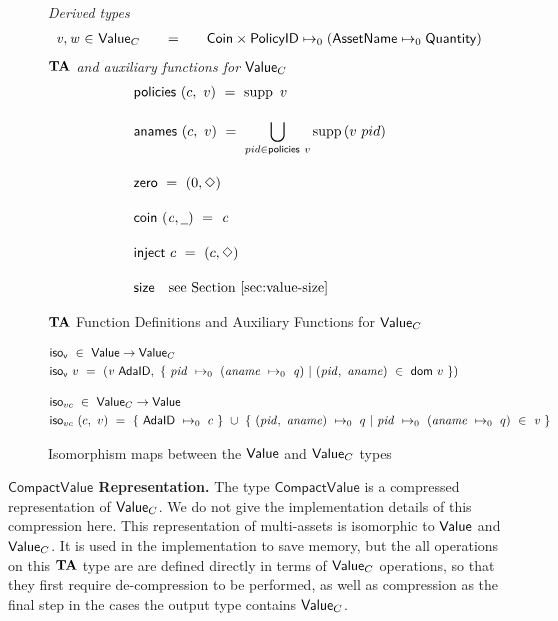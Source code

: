 \begin{figure*}[t!]
  \emph{Derived types}
  \begin{equation*}
    \begin{array}{r@{~\in~}l@{\qquad=\qquad}lr}
      \var{v}, \var{w} & \Value_C
      & \Coin \times \PolicyID \mapsto_0 ( \AssetName \mapsto_0 \Quantity )
    \end{array}
  \end{equation*}
  \emph{$\mathbf{TA}$ and auxiliary functions for $\mathsf{Value}_C$}
  \begin{align*}
    & \fun{policies}~(c,~v) ~=~ \supp{~v}
    \nextdef
    & \fun{anames}~(c, ~v) ~=~ \bigcup_{pid \in\fun{policies}{~v}} \supp{(v~pid)}
    \nextdef
    & \fun{zero} ~=~ (0, \Nothing)
    \nextdef
    & \fun{coin}~(\var{c}, \wcard) ~=~ \var{c}
    \nextdef
    & \fun{inject}~c  ~=~ (c, \Nothing)
    \nextdef
    & \fun{size} ~~~ \text{see Section \ref{sec:value-size}}
  \end{align*}
  \caption{$\mathbf{TA}$ Function Definitions and Auxiliary Functions for $\mathsf{Value}_C$}
  \label{fig:special-ada}
\end{figure*}

\begin{figure*}[t!]
  \begin{align*}
    & \fun{iso_v} ~\in~ \Value \to \Value_C \\
    & \fun{iso_v}~v ~=~(\var{v}~\mathsf{AdaID},~\{~\var{pid}~\mapsto_0~(\var{aname}~\mapsto_0~\var{q})~
    \vert~(\var{pid},~\var{aname})~\in~\fun{dom}~{v}~\})
    \nextdef
    & \fun{iso}_{vc} ~\in~ \Value_C \to \Value \\
    & \fun{iso}_{vc}~(c, ~v) ~=~ \{~\mathsf{AdaID}~\mapsto_0~c~\}~\cup~
     \{~(\var{pid},~\var{aname})~\mapsto_0~q~\vert~\var{pid}~\mapsto_0~(\var{aname}~\mapsto_0~q)~ \in~\var{v}~\}
  \end{align*}
  \caption{Isomorphism maps between the $\mathsf{Value}$ and $\mathsf{Value}_C$ types}
  \label{fig:iso-v}
\end{figure*}

\noindent \textbf{$\mathsf{CompactValue}$ Representation.}
The type $\mathsf{CompactValue}$ is a compressed representation of $\mathsf{Value}_C$.
We do not give the implementation details of this compression here.
This representation of multi-assets is isomorphic to $\mathsf{Value}$ and $\mathsf{Value}_C$.
It is used in the implementation to save memory, but the all operations on
this $\mathbf{TA}$ type are are defined directly in terms of $\mathsf{Value}_C$ operations,
so that they first require de-compression to be performed, as well as compression
as the final step in the cases the output type contains $\mathsf{Value}_C$.
